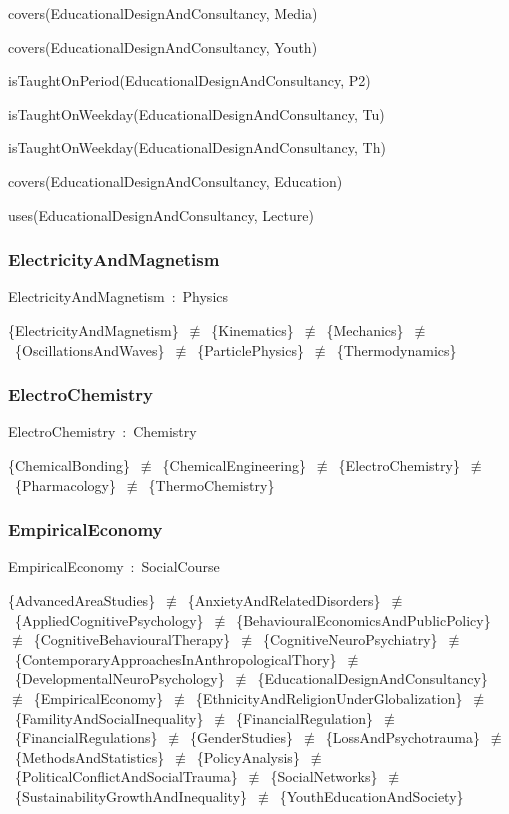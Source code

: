 \documentclass{article}
\begin{document}
covers(EducationalDesignAndConsultancy, Media)

covers(EducationalDesignAndConsultancy, Youth)

isTaughtOnPeriod(EducationalDesignAndConsultancy, P2)

isTaughtOnWeekday(EducationalDesignAndConsultancy, Tu)

isTaughtOnWeekday(EducationalDesignAndConsultancy, Th)

covers(EducationalDesignAndConsultancy, Education)

uses(EducationalDesignAndConsultancy, Lecture)

\subsubsection*{ElectricityAndMagnetism}

ElectricityAndMagnetism~:~Physics

\{ElectricityAndMagnetism\}~\ensuremath{\not\equiv}~\{Kinematics\}~\ensuremath{\not\equiv}~\{Mechanics\}~\ensuremath{\not\equiv}~\{OscillationsAndWaves\}~\ensuremath{\not\equiv}~\{ParticlePhysics\}~\ensuremath{\not\equiv}~\{Thermodynamics\}

\subsubsection*{ElectroChemistry}

ElectroChemistry~:~Chemistry

\{ChemicalBonding\}~\ensuremath{\not\equiv}~\{ChemicalEngineering\}~\ensuremath{\not\equiv}~\{ElectroChemistry\}~\ensuremath{\not\equiv}~\{Pharmacology\}~\ensuremath{\not\equiv}~\{ThermoChemistry\}

\subsubsection*{EmpiricalEconomy}

EmpiricalEconomy~:~SocialCourse

\{AdvancedAreaStudies\}~\ensuremath{\not\equiv}~\{AnxietyAndRelatedDisorders\}~\ensuremath{\not\equiv}~\{AppliedCognitivePsychology\}~\ensuremath{\not\equiv}~\{BehaviouralEconomicsAndPublicPolicy\}~\ensuremath{\not\equiv}~\{CognitiveBehaviouralTherapy\}~\ensuremath{\not\equiv}~\{CognitiveNeuroPsychiatry\}~\ensuremath{\not\equiv}~\{ContemporaryApproachesInAnthropologicalThory\}~\ensuremath{\not\equiv}~\{DevelopmentalNeuroPsychology\}~\ensuremath{\not\equiv}~\{EducationalDesignAndConsultancy\}~\ensuremath{\not\equiv}~\{EmpiricalEconomy\}~\ensuremath{\not\equiv}~\{EthnicityAndReligionUnderGlobalization\}~\ensuremath{\not\equiv}~\{FamilityAndSocialInequality\}~\ensuremath{\not\equiv}~\{FinancialRegulation\}~\ensuremath{\not\equiv}~\{FinancialRegulations\}~\ensuremath{\not\equiv}~\{GenderStudies\}~\ensuremath{\not\equiv}~\{LossAndPsychotrauma\}~\ensuremath{\not\equiv}~\{MethodsAndStatistics\}~\ensuremath{\not\equiv}~\{PolicyAnalysis\}~\ensuremath{\not\equiv}~\{PoliticalConflictAndSocialTrauma\}~\ensuremath{\not\equiv}~\{SocialNetworks\}~\ensuremath{\not\equiv}~\{SustainabilityGrowthAndInequality\}~\ensuremath{\not\equiv}~\{YouthEducationAndSociety\}
\end{document}

